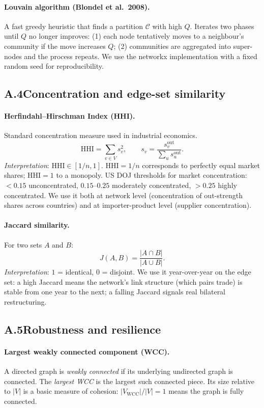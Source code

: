 \documentclass[11pt,a4paper]{article}
\begin{document}
\paragraph{Louvain algorithm (Blondel et al.\ 2008).}
A fast greedy heuristic that finds a partition $\mathcal{C}$ with high
$Q$. Iterates two phases until $Q$ no longer improves:
(1) each node tentatively moves to a neighbour's community if the move
increases $Q$;
(2) communities are aggregated into super-nodes and the process repeats.
We use the networkx implementation with a fixed random seed for
reproducibility.

\subsection*{A.4\quad Concentration and edge-set similarity}

\paragraph{Herfindahl--Hirschman Index (HHI).}
Standard concentration measure used in industrial economics.
\[
\mathrm{HHI} = \sum_{v \in V} s_v^2,
\qquad
s_v = \frac{s_v^{\text{out}}}{\sum_{u} s_u^{\text{out}}}.
\]
\emph{Interpretation}: $\mathrm{HHI} \in [1/n, 1]$.
$\mathrm{HHI} = 1/n$ corresponds to perfectly equal market shares;
$\mathrm{HHI} = 1$ to a monopoly.
US DOJ thresholds for market concentration: $<0.15$ unconcentrated, $0.15$--$0.25$
moderately concentrated, $>0.25$ highly concentrated.
We use it both at network level (concentration of out-strength shares
across countries) and at importer-product level (supplier concentration).

\paragraph{Jaccard similarity.}
For two sets $A$ and $B$:
\[
J(A, B) = \frac{|A \cap B|}{|A \cup B|}.
\]
\emph{Interpretation}: $1$ = identical, $0$ = disjoint. We use it
year-over-year on the edge set: a high Jaccard means the network's link
structure (which pairs trade) is stable from one year to the next; a
falling Jaccard signals real bilateral restructuring.

\subsection*{A.5\quad Robustness and resilience}

\paragraph{Largest weakly connected component (WCC).}
A directed graph is \emph{weakly connected} if its underlying undirected
graph is connected. The \emph{largest WCC} is the largest such connected
piece. Its size relative to $|V|$ is a basic measure of cohesion:
$|V_{\text{WCC}}|/|V| = 1$ means the graph is fully connected.
\end{document}
